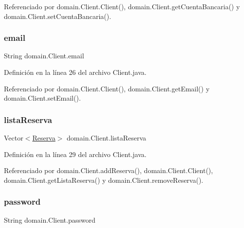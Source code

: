 Referenciado por domain.\+Client.\+Client(), domain.\+Client.\+get\+Cuenta\+Bancaria() y domain.\+Client.\+set\+Cuenta\+Bancaria().

\mbox{\label{classdomain_1_1_client_a47341a6cb46fb5c2c61885669070a939}} 
\subsubsection{\texorpdfstring{email}{email}}
{\footnotesize\ttfamily String domain.\+Client.\+email\hspace{0.3cm}{\ttfamily [private]}}



Definición en la línea 26 del archivo Client.\+java.



Referenciado por domain.\+Client.\+Client(), domain.\+Client.\+get\+Email() y domain.\+Client.\+set\+Email().

\mbox{\label{classdomain_1_1_client_ae4e6d3d763ee52755c66f199270dd420}} 
\subsubsection{\texorpdfstring{listaReserva}{listaReserva}}
{\footnotesize\ttfamily Vector$<$\mbox{\hyperlink{classdomain_1_1_reserva}{Reserva}}$>$ domain.\+Client.\+lista\+Reserva\hspace{0.3cm}{\ttfamily [private]}}



Definición en la línea 29 del archivo Client.\+java.



Referenciado por domain.\+Client.\+add\+Reserva(), domain.\+Client.\+Client(), domain.\+Client.\+get\+Lista\+Reserva() y domain.\+Client.\+remove\+Reserva().

\mbox{\label{classdomain_1_1_client_ad8c3f3e676480cdf083669c007f1e397}} 
\subsubsection{\texorpdfstring{password}{password}}
{\footnotesize\ttfamily String domain.\+Client.\+password\hspace{0.3cm}{\ttfamily [private]}}



